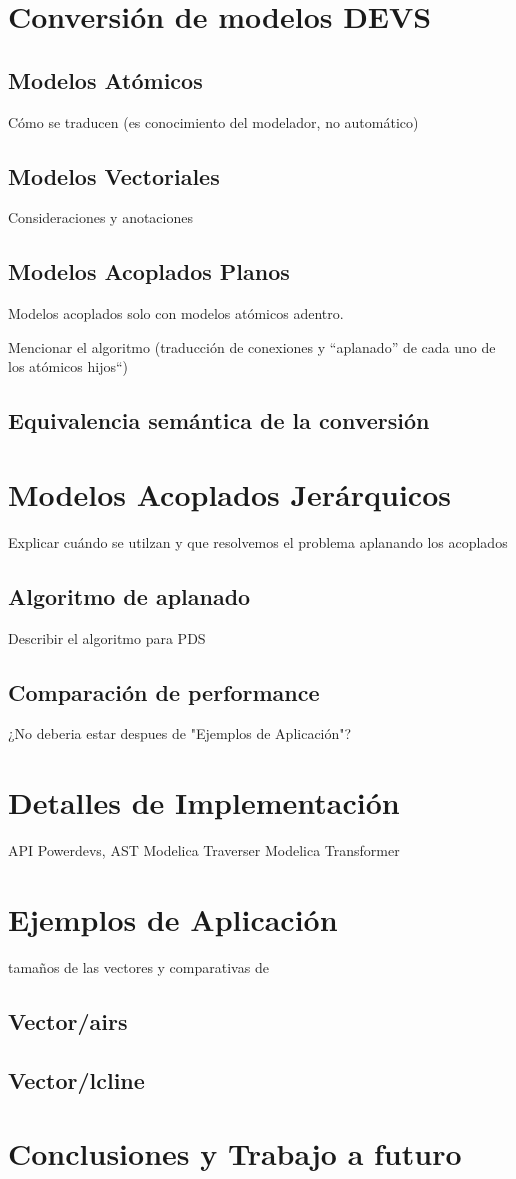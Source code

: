 \documentclass[a4paper,	11pt]{article}
\begin{document}
\section{Conversión de modelos DEVS}
\subsection{Modelos Atómicos}
Cómo se traducen (es conocimiento del modelador, no automático)
\subsection{Modelos Vectoriales}
Consideraciones  y anotaciones

\subsection{Modelos Acoplados Planos}
Modelos acoplados solo con modelos atómicos adentro.

Mencionar el algoritmo (traducción de conexiones y ``aplanado'' de cada uno de los atómicos hijos``)	

\subsection{Equivalencia semántica de la conversión}

\section{Modelos Acoplados Jerárquicos}
Explicar cuándo se utilzan y que resolvemos el problema aplanando los acoplados

\subsection{Algoritmo de aplanado}
Describir el algoritmo para PDS


\subsection{Comparación de performance}
¿No deberia estar despues de "Ejemplos de Aplicación"?

\section{Detalles de Implementación}
API Powerdevs, AST Modelica
Traverser
Modelica Transformer


\section{Ejemplos de Aplicación}
tamaños de las vectores y comparativas de 
\subsection{Vector/airs}
\subsection{Vector/lcline}

\section{Conclusiones y Trabajo a futuro}


\begin{small}

\end{small}
\end{document}
